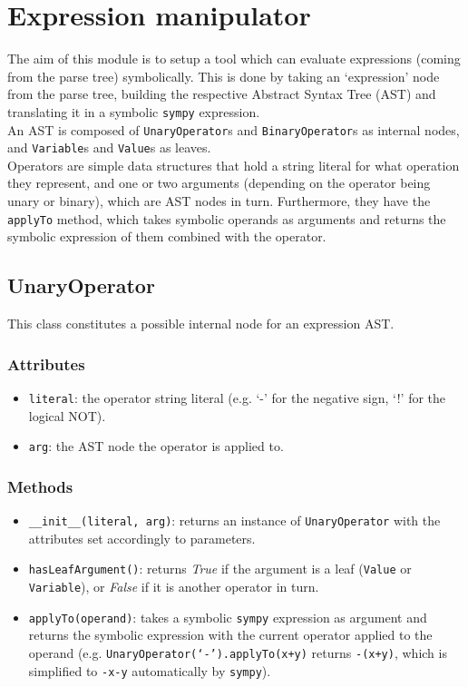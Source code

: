 \documentclass[12pt,a4paper]{report}
\theoremstyle{definition}
\theoremstyle{definition}
\theoremstyle{definition}
\begin{document}
\section{Expression manipulator}
The aim of this module is to setup a tool which can evaluate expressions (coming from the parse tree) symbolically. This is done by taking an `expression' node from the parse tree, building the respective Abstract Syntax Tree (AST) and translating it in a symbolic \texttt{sympy} expression.\\
An AST is composed of \texttt{UnaryOperator}s and \texttt{BinaryOperator}s as internal nodes, and \texttt{Variable}s and \texttt{Value}s as leaves.\\
Operators are simple data structures that hold a string literal for what operation they represent, and one or two arguments (depending on the operator being unary or binary), which are AST nodes in turn. Furthermore, they have the \texttt{applyTo} method, which takes symbolic operands as arguments and returns the symbolic expression of them combined with the operator.\\
\subsection{UnaryOperator}
This class constitutes a possible internal node for an expression AST.
\subsubsection{Attributes}
\begin{itemize}
    \itemsep 0em
    \item \texttt{literal}: the operator string literal (e.g. `-' for the negative sign, `!' for the logical NOT).
    \item \texttt{arg}: the AST node the operator is applied to.
\end{itemize}
\subsubsection{Methods}
\begin{itemize}
    \itemsep 0em
    \item \texttt{\_\_init\_\_(literal, arg)}: returns an instance of \texttt{UnaryOperator} with the attributes set accordingly to parameters.
    \item \texttt{hasLeafArgument()}: returns \textit{True} if the argument is a leaf (\texttt{Value} or \texttt{Variable}), or \textit{False} if it is another operator in turn.
    \item \texttt{applyTo(operand)}: takes a symbolic \texttt{sympy} expression as argument and returns the symbolic expression with the current operator applied to the operand (e.g. \texttt{UnaryOperator(`-').applyTo(x+y)} returns \texttt{-(x+y)}, which is simplified to \texttt{-x-y} automatically by \texttt{sympy}).
\end{itemize}
\end{document}
